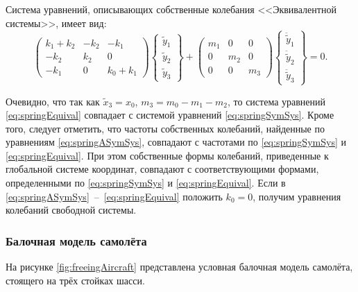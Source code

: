 Система уравнений, описывающих собственные колебания <<Эквивалентной системы>>, имеет вид:
\begin{equation}
	\begin{pmatrix}
		k_1+k_2 & -k_2 & -k_1 \\
		-k_2 & k_2 & 0 \\
		-k_1 & 0 & k_0+k_1
	\end{pmatrix}
	\begin{Bmatrix}
		\tilde{y}_1 \\ \tilde{y}_2 \\ \tilde{y}_3
	\end{Bmatrix} +
	\begin{pmatrix}
		m_1 & 0 & 0 \\
		0 & m_2 & 0 \\
		0 & 0 & m_3
	\end{pmatrix}
	\begin{Bmatrix}
		\ddot{\tilde{y}}_1 \\ \ddot{\tilde{y}}_2 \\ \ddot{\tilde{y}}_3
	\end{Bmatrix} = 0.
	\label{eq:springEquival}
\end{equation}

Очевидно, что так как $ \tilde{x}_3 = x_0 $, $ m_3 = m_0 - m_1 - m_2$, то система уравнений \eqref{eq:springEquival} совпадает с системой уравнений \eqref{eq:springSymSys}. Кроме того, следует отметить, что частоты собственных колебаний, найденные по уравнениям \eqref{eq:springASymSys}, совпадают с частотами по \eqref{eq:springSymSys} и \eqref{eq:springEquival}. При этом собственные формы колебаний, приведенные к глобальной системе координат, совпадают с соответствующими формами, определенными по \eqref{eq:springSymSys} и \eqref{eq:springEquival}. Если в \eqref{eq:springASymSys}~--~\eqref{eq:springEquival} положить $ k_0 = 0$, получим уравнения колебаний свободной системы.

\subsubsection{Балочная модель самолёта}

На рисунке \ref{fig:freeingAircraft} представлена условная балочная модель самолёта, стоящего на трёх стойках шасси.


